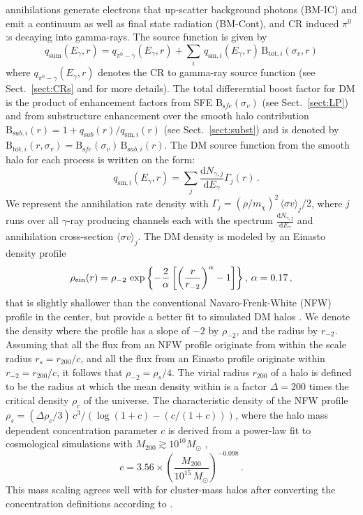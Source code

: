 \documentclass[10pt,aps,pra,reprint,amsmath,amsfonts,amssymb,showpacs]{revtex4-1}
\newcommand{\sfe}{{\rmn sfe}}
\newcommand{\sub}{{\rmn sub}}
\newcommand{\msun}{{M_\odot}}
\newcommand{\rmn}{\mathrm}
\newcommand{\dd}{\mathrm{d}}
\newcommand{\mx}{\ensuremath{m_{\chi}}}
\newcommand{\ngammaj}{\ensuremath{N_{\gamma,j}}}
\newcommand{\sigmaannv}{\ensuremath{\langle\sigma v\rangle}}
\newcommand{\sigv}{\ensuremath{\sigma_v}}
\newcommand{\egamma}{\ensuremath{E_{\gamma}}}
\newcommand{\rhos}{\ensuremath{\rho_s}}
\newcommand{\rs}{\ensuremath{r_s}}
\newcommand{\rvir}{r_{200}}
\newcommand{\mvir}{M_{200}}
\newcommand{\rhoc}{\ensuremath{\rho_c}}
\newcommand{\B}{\rmn{B}}
\newcommand{\eg}{E_\gamma}
\begin{document}
annihilations generate electrons that up-scatter background photons
(BM-IC) and emit a continuum as well as final state radiation
(BM-Cont), and CR induced $\pi^0$:s decaying into gamma-rays. The
source function is given by
\begin{equation}
q_\rmn{sum} (\eg,r) = q_{\pi^0-\gamma}(\eg,r)+
\sum_i \,q_{\rmn{sm},i}(\eg,r)\,\B_{\rmn{tot},i}(\sigv,r)
\end{equation}
where $ q_{\pi^0-\gamma}(\eg,r)$ denotes the CR to gamma-ray source
function (see Sect.~\ref{sect:CRs} and \cite{2010MNRAS.409..449P}
for more details). The total differerntial boost factor for DM is the
product of enhancement factors from SFE $\B_\sfe(\sigv)$ (see
Sect.~\ref{sect:LP}) and from substructure enhancement over the
smooth halo contribution $\B_{\sub,i}(r) = 1+q_\sub(r)/q_{\rmn{sm},i}(r)$
(see Sect.~\ref{sect:subst}) and is denoted by
$\B_{\rmn{tot},i}(r,\sigv) = \B_\sfe(\sigv)\,\B_{\sub,i}(r)$. The DM
source function from the smooth halo for each process is written on
the form:
\begin{equation}
\quad q_{\rmn{sm},i} (\egamma,r) = \sum_j
\frac{\dd \ngammaj}{\dd E_\gamma} \Gamma_j(r)\,.
\end{equation}
We represent the annihilation rate density with $\Gamma_j =
(\rho/\mx)^2 \, \sigmaannv_j/2$, where $j$ runs over all $\gamma$-ray
producing channels each with the spectrum $\frac{\dd
  \ngammaj}{\dd\eg}$ and annihilation cross-section $\sigmaannv_j$.
The DM density is modeled by an Einasto density profile
\begin{equation}
\rho_{\rm ein}(r) = \rho_{-2}\,\exp\left\{-\frac{2}{\alpha}
  \left[\left(\frac{r}{r_{-2}}\right)^\alpha -1 \right] \right\},\,
\alpha=0.17 \,,
\end{equation}
that is slightly shallower than the conventional Navaro-Frenk-White
(NFW) profile in the center, but provide a better fit to simulated DM
halos \cite{2010MNRAS.402...21N}. We denote the density where the
profile has a slope of $-2$ by $\rho_{-2}$, and the radius by
$r_{-2}$. Assuming that all the flux from an NFW profile originate
from within the scale radius $\rs=\rvir/c$, and all the flux from an
Einasto profile originate within $r_{-2}=\rvir/c$, it follows that
$\rho_{-2} = \rhos/4$. The virial radius $\rvir$ of a halo is defined
to be the radius at which the mean density within is a factor
$\Delta=200$ times the critical density $\rhoc$ of the universe. The
characteristic density of the NFW profile $\rhos=(\Delta\rhoc/3)\,
c^3/(\log(1+c)-(c/(1+c)))$, where the halo mass dependent
concentration parameter $c$ is derived from a power-law fit to
cosmological simulations with $\mvir \gtrsim 10^{10} \msun$
\cite{2008MNRAS.391.1940M},
\begin{equation}
\label{eq:cfit}
  c=3.56 \times \left(\frac{\mvir}{10^{15}\,\msun}\right)^{-0.098}\,.
\end{equation}
This mass scaling agrees well with \cite{2009ApJ...707..354Z} for
cluster-mass halos after converting the concentration definitions
according to \cite{2003ApJ...584..702H}.
\end{document}
